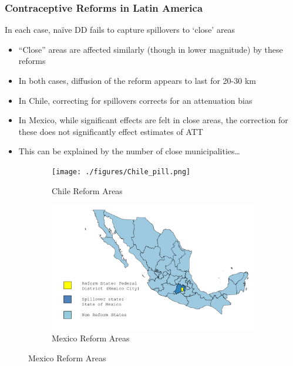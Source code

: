 \documentclass[10pt,letterpaper,subeqn]{beamer}
\begin{document}
\begin{frame}[label=empirB2]

\end{frame}

\begin{frame}[label=empirB3]
 \frametitle{Contraceptive Reforms in Latin America}
In each case, na\"ive DD fails to capture spillovers to `close' areas
\vspace{8mm}
\begin{itemize}
\item ``Close'' areas are affected similarly (though in lower magnitude) by these reforms
\item In both cases, diffusion of the reform appears to last for 20-30 km
\item In Chile, correcting for spillovers corrects for an attenuation bias
\item In Mexico, while significant effects are felt in close areas, the correction for
these does not significantly effect estimates of ATT
\item This can be explained by the number of close municipalities\ldots
\end{itemize}
\end{frame}



\begin{frame}[label=MexMap]
\begin{figure}
\centering
\begin{subfigure}{.5\textwidth}
  \centering
  \texttt{[image: ./figures/Chile\_pill.png]}
  \caption{Chile Reform Areas}
  \label{fig:sub1}
\end{subfigure}%
\begin{subfigure}{.5\textwidth}
  \centering
  \vspace{2.2cm}
  \includegraphics[scale=0.16]{./figures/MexReform.png}
  \vspace{2.2cm}
  \caption{Mexico Reform Areas}
  \label{fig:sub2}
\end{subfigure}
\end{figure}
\end{frame}
\end{document}
